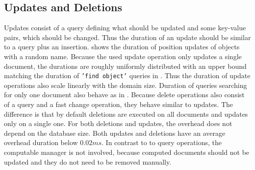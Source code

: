 \subsection{Updates and Deletions}
Updates consist of a query defining what should be updated and some
key-value pairs, which should be changed. Thus the duration of an
update should be similar to a query plus an
insertion.  shows the duration of
position updates of objects with a random name. Because the used
update operation only updates a single document, the durations are
roughly uniformly distributed with an upper bound matching the
duration of \texttt{'find object'} queries in
. Thus the duration of update operations
also scale linearly with the domain size. Duration of queries
searching for only one document also behave as in
.  Because delete operations also consist
of a query and a fast change operation, they behave similar to
updates. The difference is that by default deletions are executed on
all documents and updates only on a single one. For both deletions and
updates, the overhead does not depend on the database size. Both
updates and deletions have an average overhead duration below
$0.02ms$. In contrast to to query operations, the computable manager
is not involved, because computed documents should not be updated and
they do not need to be removed manually.

